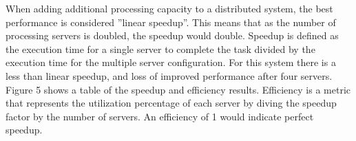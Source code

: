 \documentclass{article}
\newenvironment{Figure}
               {\par\medskip\noindent\minipage{\linewidth}}
               {\endminipage\par\medskip}
\begin{document}
\begin{multicols}{2}
\begin{Figure}
  \centering
  \noindent{}
\end{Figure}

When adding additional processing capacity to a distributed system, the best performance is considered ''linear speedup''.  This means that as the number of processing servers is doubled, the speedup would double. Speedup is defined as the execution time for a single server to complete the task divided by the execution time for the multiple server configuration.  For this system there is a less than linear speedup, and loss of improved performance after four servers.  Figure 5 shows a table of the speedup and efficiency results.  Efficiency is a metric that represents the utilization percentage of each server by diving the speedup factor by the number of servers.  An efficiency of 1 would indicate perfect speedup.


\end{multicols}
\end{document}
